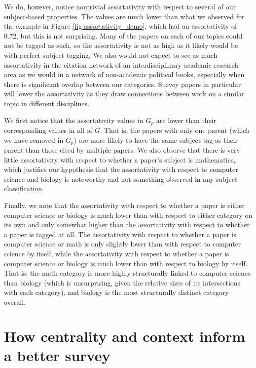 \documentclass[12pt]{thesis}
\theoremstyle{plain}
\theoremstyle{definition}
\theoremstyle{remark}
\begin{document}
We do, however, notice nontrivial assortativity with respect to several of our subject-based properties. The values are much lower than what we observed for the example in Figure \ref{fig:assortativity_demo}, which had an assortativity of 0.72, but this is not surprising. Many of the papers on each of our topics could not be tagged as such, so the assortativity is not as high as it likely would be with perfect subject tagging. We also would not expect to see as much assortativity in the citation network of an interdisciplinary academic research area as we would in a network of non-academic political books, especially when there is significant overlap between our categories. Survey papers in particular will lower the assortativity as they draw connections between work on a similar topic in different disciplines.

We first notice that the assortativity values in $G_p$ are lower than their corresponding values in all of $G$. That is, the papers with only one parent (which we have removed in $G_p$) are more likely to have the same subject tag as their parent than those cited by multiple papers. We also observe that there is very little assortativity with respect to whether a paper's subject is mathematics, which justifies our hypothesis that the assortativity with respect to computer science and biology is noteworthy and not something observed in any subject classification.

Finally, we note that the assortativity with respect to whether a paper is either computer science or biology is much lower than with respect to either category on its own and only somewhat higher than the assortativity with respect to whether a paper is tagged at all. The assortativity with respect to whether a paper is computer science or math is only slightly lower than with respect to computer science by itself, while the assortativity with respect to whether a paper is computer science or biology is much lower than with respect to biology by itself. That is, the math category is more highly structurally linked to computer science than biology (which is unsurprising, given the relative sizes of its intersections with each category), and biology is the most structurally distinct category overall. 








\section{How centrality and context inform a better survey}
\end{document}
